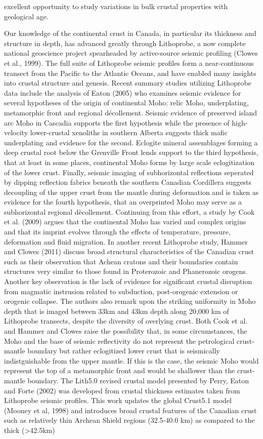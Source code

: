 \documentclass[review]{elsarticle}
\begin{document}
excellent opportunity to study variations in bulk crustal properties with geological age.

Our knowledge of the continental crust in Canada, in particular its thickness and structure in depth, has advanced greatly through Lithoprobe, a now complete national geoscience project spearheaded by active-source seismic profiling (Clowes et al., 1999). The full suite of Lithoprobe seismic profiles form a near-continuous transect from the Pacific to the Atlantic Oceans, and have enabled many insights into crustal structure and genesis. Recent summary studies utilizing Lithoprobe data include the analysis of Eaton (2005) who examines seismic evidence for several hypotheses of the origin of continental Moho: relic Moho, underplating, metamorphic front and regional décollement. Seismic evidence of preserved island arc Moho in Cascadia supports the first hypothesis while the presence of high-velocity lower-crustal xenoliths in southern Alberta suggests thick mafic underplating and evidence for the second. Eclogite mineral assemblages forming a deep crustal root below the Grenville Front lends support to the third hypothesis, that at least in some places, continental Moho forms by large scale eclogitization of the lower crust. Finally, seismic imaging of subhorizontal reflections seperated by dipping reflection fabrics beneath the southern Canadian Cordillera suggests decoupling of the upper crust from the mantle during deformation and is taken as evidence for the fourth hypothesis, that an overprinted Moho may serve as a subhorizontal regional dècollement. Continuing from this effort, a study by Cook et al. (2009) argues that the continental Moho has varied and complex origins and that its imprint evolves through the effects of temperature, pressure, deformation and fluid migration. In another recent Lithoprobe study, Hammer and Clowes (2011) discuss broad structural characteristics of the Canadian crust such as their observation that Achean cratons and their boundaries contain structures very similar to those found in Proterozoic and Phanerozoic orogens. Another key observation is the lack of evidence for significant crustal disruption from magmatic instrusion related to subduction, post-orogenic extension or orogenic collapse. The authors also remark upon the striking uniformity in Moho depth that is imaged between 33km and 43km depth along 20,000 km of Lithoprobe transects, despite the diversity of overlying crust. Both Cook et al. and Hammer and Clowes raise the possibility that, in some circumstances, the Moho and the base of seismic reflectivity do not represent the petrological crust-mantle boundary but rather eclogitized lower crust that is seismically indistguishable from the upper mantle. If this is the case, the seismic Moho would represent the top of a metamorphic front and would be shallower than the crust-mantle boundary. The Lith5.0 revised crustal model presented by Perry, Eaton and Forte (2002) was developed from crustal thickness estimates taken from Lithoprobe seismic profiles. This work updates the global Crust5.1 model (Mooney et al, 1998) and introduces broad crustal features of the Canadian crust such as relatively thin Archean Shield regions (32.5-40.0 km) as compared to the thick (>42.5km) 
\end{document}
